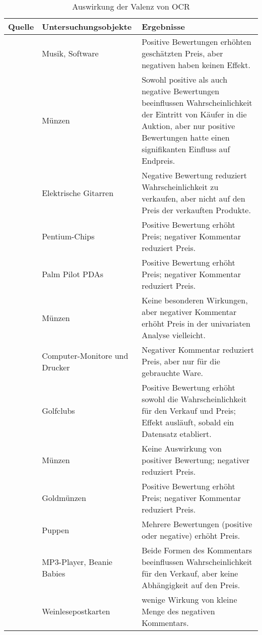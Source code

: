 \begin{table}[htb]
\centering
\begin{tabularx}{\textwidth}{|XXX|}
\hline
Quelle& Untersuchungsobjekte& Ergebnisse\\ \hline
\citet{ba2002evidence}& Musik, Software& Positive Bewertungen erhöhten geschätzten Preis, aber negativen haben keinen Effekt.\\ \hline
\citet{bajari2003winner}& Münzen& Sowohl positive als auch negative Bewertungen beeinflussen Wahrscheinlichkeit der Eintritt von Käufer in die Auktion, aber nur positive Bewertungen hatte einen signifikanten Einfluss auf Endpreis. \\ \hline
\citet{eaton2002valuing}& Elektrische Gitarren& Negative Bewertung reduziert Wahrscheinlichkeit zu verkaufen, aber nicht auf den Preis der verkauften Produkte.\\ \hline
\citet{houser2006reputation}& Pentium-Chips& Positive Bewertung erhöht Preis; negativer Kommentar reduziert Preis.\\ \hline
\citet{kalyanam2001returns}& Palm Pilot PDAs& Positive Bewertung erhöht Preis; negativer Kommentar reduziert Preis.\\ \hline
\citet{kauffman2000running}& Münzen& Keine besonderen Wirkungen, aber negativer Kommentar erhöht Preis in der univariaten Analyse vielleicht.\\ \hline
\citet{lee2000effect}& Computer-Monitore und Drucker& Negativer Kommentar reduziert Preis, aber nur für die gebrauchte Ware.\\ \hline
\citet{livingston2005valuable}& Golfclubs& Positive Bewertung erhöht sowohl die Wahrscheinlichkeit für den Verkauf und Preis; Effekt ausläuft, sobald ein Datensatz etabliert.\\ \hline
\citet{lucking2007pennies}& Münzen& Keine Auswirkung von positiver Bewertung; negativer reduziert Preis.\\ \hline
\citet{melnik2002does}& Goldmünzen& Positive Bewertung erhöht Preis; negativer Kommentar reduziert Preis.\\ \hline
\citet{mcdonald2002reputation}& Puppen& Mehrere Bewertungen (positive oder negative) erhöht Preis. \\ \hline
\citet{resnick2002trust}& MP3-Player, Beanie Babies& Beide Formen des Kommentars beeinflussen Wahrscheinlichkeit für den Verkauf, aber keine Abhängigkeit auf den Preis.\\ \hline
\citet{resnick2006value}& Weinlesepostkarten& wenige Wirkung von kleine Menge des negativen Kommentars.\\ \hline
\end{tabularx}
\label{tab:onlinefeedback}
\caption[Auswirkung der Valenz von OCR]{Auswirkung der Valenz von \ac{OCR}}
\end{table}

